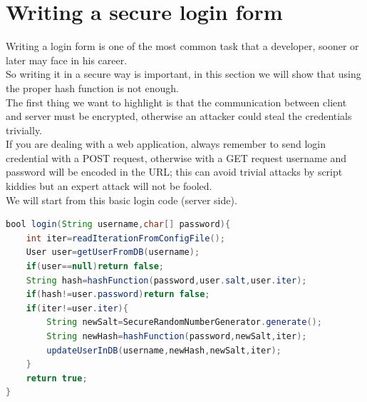 \section{Writing a secure login form}
Writing a login form is one of the most common task that a developer, sooner or later may face in his career.\\
So writing it in a secure way is important, in this section we will show that using the proper hash function is not enough.\\
The first thing we want to highlight is that the communication between client and server must be encrypted, otherwise an attacker could steal the credentials trivially.\\
If you are dealing with a web application, always remember to send login credential with a POST request, otherwise with a GET request username and password will be encoded in the URL; this can avoid trivial attacks by script kiddies but an expert attack will not be fooled.\\
We will start from this basic login code (server side).\\
\begin{lstlisting}[language=Java]
bool login(String username,char[] password){
	int iter=readIterationFromConfigFile();
	User user=getUserFromDB(username);
	if(user==null)return false;
	String hash=hashFunction(password,user.salt,user.iter);
	if(hash!=user.password)return false;
	if(iter!=user.iter){
		String newSalt=SecureRandomNumberGenerator.generate();
		String newHash=hashFunction(password,newSalt,iter);
		updateUserInDB(username,newHash,newSalt,iter);
	}
	return true;
}
\end{lstlisting}



